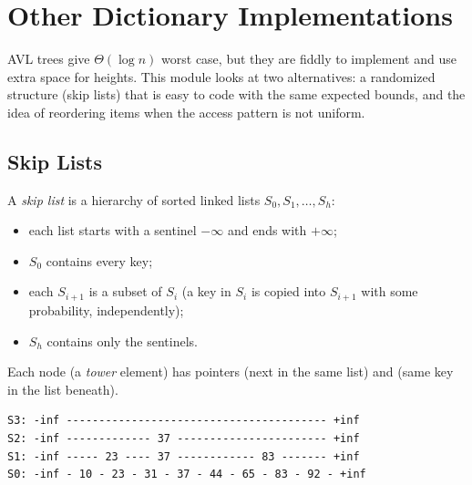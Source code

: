 \chapter{Other Dictionary Implementations}

AVL trees give $\Theta(\log n)$ worst case, but they are fiddly to implement and
use extra space for heights. This module looks at two alternatives: a
randomized structure (skip lists) that is easy to code with the same expected
bounds, and the idea of reordering items when the access pattern is not uniform.

\section{Skip Lists}

\begin{definition}
A \emph{skip list} is a hierarchy of sorted linked lists $S_0, S_1, \ldots, S_h$:
\begin{itemize}
  \item each list starts with a sentinel $-\infty$ and ends with $+\infty$;
  \item $S_0$ contains every key;
  \item each $S_{i+1}$ is a subset of $S_i$ (a key in $S_i$ is copied into
        $S_{i+1}$ with some probability, independently);
  \item $S_h$ contains only the sentinels.
\end{itemize}
Each node (a \emph{tower} element) has pointers  (next in the same
list) and  (same key in the list beneath).
\end{definition}

\begin{example}
\begin{verbatim}
S3: -inf ---------------------------------------- +inf
S2: -inf ------------- 37 ----------------------- +inf
S1: -inf ----- 23 ---- 37 ------------ 83 ------- +inf
S0: -inf - 10 - 23 - 31 - 37 - 44 - 65 - 83 - 92 - +inf
\end{verbatim}
\end{example}

